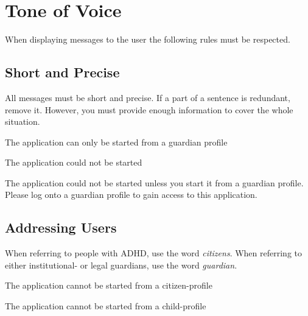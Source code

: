 
\chapter{Tone of Voice}
When displaying messages to the user the following rules must be respected.

\section{Short and Precise}
All messages must be short and precise. If a part of a sentence is redundant, remove it. However, you must provide enough information to cover the whole situation.

\begin{exampleR}
	The application can only be started from a guardian profile
\end{exampleR}

\begin{exampleW}
	The application could not be started
\end{exampleW}

\begin{exampleW}
	The application could not be started unless you start it from a guardian profile. Please log onto a guardian profile to gain access to this application.
\end{exampleW}

\section{Addressing Users}
When referring to people with ADHD, use the word \textit{citizens}. When referring to either institutional- or legal guardians, use the word \textit{guardian}.

\begin{exampleR}
	The application cannot be started from a citizen-profile
\end{exampleR}

\begin{exampleW}
	The application cannot be started from a child-profile
\end{exampleW}